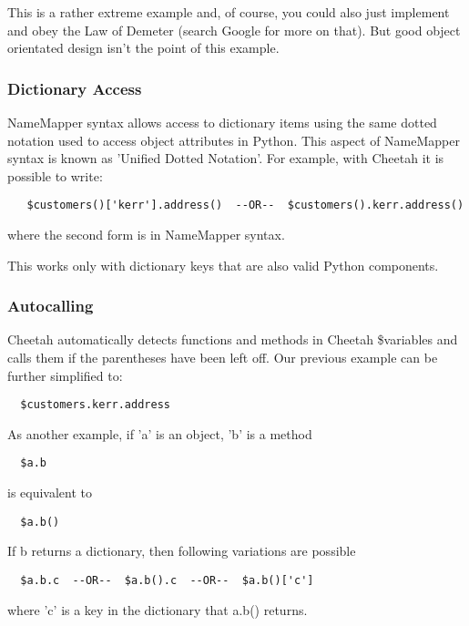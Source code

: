 This is a rather extreme example and, of course, you could also just implement
 and obey the Law of Demeter (search Google for more
on that).  But good object orientated design isn't the point of this example.

\subsubsection{Dictionary Access}
\label{language.namemapper.dict}

NameMapper syntax allows access to dictionary items using the same dotted
notation used to access object attributes in Python.  This aspect of NameMapper
syntax is known as 'Unified Dotted Notation'.
For example, with Cheetah it is possible to write:
\begin{verbatim}
   $customers()['kerr'].address()  --OR--  $customers().kerr.address()
\end{verbatim}
where the second form is in NameMapper syntax.

This works only with dictionary keys that are also valid Python components.

\subsubsection{Autocalling}
\label{language.namemapper.autocalling}

Cheetah automatically detects functions and methods in Cheetah \$variables and
calls them if the parentheses have been left off.  Our previous example can be
further simplified to:
\begin{verbatim}
  $customers.kerr.address
\end{verbatim}

As another example, if 'a' is an object, 'b' is a method
\begin{verbatim}
  $a.b
\end{verbatim}

is equivalent to

\begin{verbatim}
  $a.b()
\end{verbatim}

If b returns a dictionary, then following variations are possible
\begin{verbatim}
  $a.b.c  --OR--  $a.b().c  --OR--  $a.b()['c']
\end{verbatim}
where 'c' is a key in the dictionary that a.b() returns.

